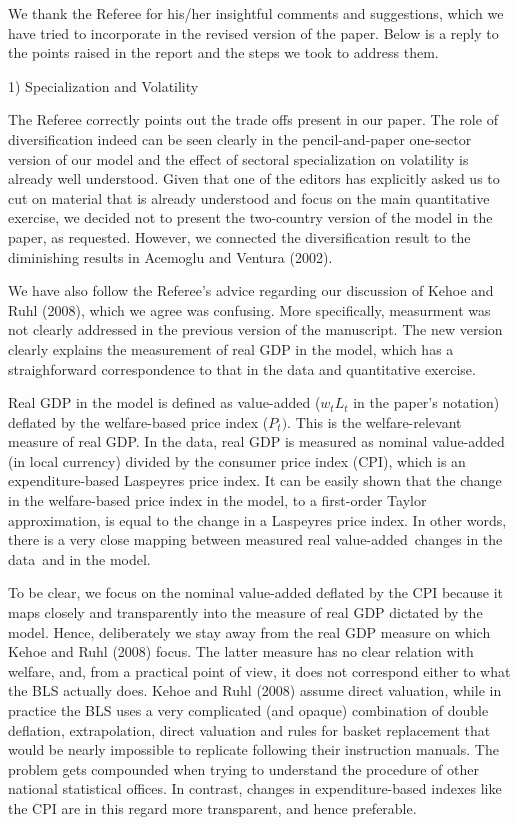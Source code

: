 \documentclass[12pt]{article}
\begin{document}
We thank the Referee for his/her insightful comments and suggestions, which
we have tried to incorporate in the revised version of the paper. Below is a
reply to the points raised in the report and the steps we took to address
them.

\bigskip

1) Specialization and Volatility

The Referee correctly points out the trade offs present in our paper. The
role of diversification indeed can be seen clearly in the pencil-and-paper
one-sector version of our model and the effect of sectoral specialization on
volatility is already well understood. Given that one of the editors has
explicitly asked us to cut on material that is already understood and focus
on the main quantitative exercise, we decided not to present the two-country
version of the model in the paper, as requested. However, we connected the
diversification result to the diminishing results in Acemoglu and Ventura
(2002). 

We have also follow the Referee's advice regarding our discussion of Kehoe
and Ruhl (2008), which we agree was confusing. More specifically, measurment
was not clearly addressed in the previous version of the manuscript. The new
version clearly explains the measurement of real GDP in the model, which has
a straighforward correspondence to that in the data and quantitative
exercise.

Real GDP in the model is defined as value-added ($w_{t}L_{t}$ in the paper's
notation) deflated by the welfare-based price index ($P_{t})$. This is the
welfare-relevant measure of real GDP. In the data, real GDP is measured as
nominal value-added (in local currency) divided by the consumer price index
(CPI), which is an expenditure-based Laspeyres price index. It can be easily
shown that the change in the welfare-based price index in the model, to a
first-order Taylor approximation, is equal to the change in a Laspeyres
price index. In other words, there is a very close mapping between measured
real value-added\ changes in the data\ and in the model.

To be clear, we focus on the nominal value-added deflated by the CPI because
it maps closely and transparently into the measure of real GDP dictated by
the model. Hence, deliberately we stay away from the real GDP measure on
which Kehoe and Ruhl (2008) focus. The latter measure has no clear relation
with welfare, and, from a practical point of view, it does not correspond
either to what the BLS actually does. Kehoe and Ruhl (2008) assume direct
valuation, while in practice the BLS uses a very complicated (and opaque)
combination of double deflation, extrapolation, direct valuation and rules
for basket replacement that would be nearly impossible to replicate
following their instruction manuals. The problem gets compounded when trying
to understand the procedure of other national statistical offices. In
contrast, changes in expenditure-based indexes like the CPI are in this
regard more transparent, and hence preferable.
\end{document}
